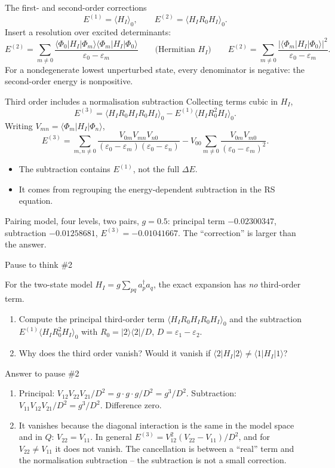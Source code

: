 \documentclass[aspectratio=169,10pt]{beamer}
\newcounter{thinkctr}
\newcommand{\thinkq}[2]{%
  \stepcounter{thinkctr}%
  \vfill
  \begin{tcolorbox}[enhanced,colback=palewarm,colframe=warm,boxrule=1.2pt,arc=4pt,
    grow to left by=6mm,grow to right by=6mm,
    left=16pt,right=16pt,top=16pt,bottom=18pt,
    fonttitle=\bfseries\Large,fontupper=\Large,
    title={Pause to think \#\thethinkctr\hfill\mdseries\normalsize(about #1 min -- discuss with your neighbour)}]
  #2
  \end{tcolorbox}
  \vfill}
\newcommand{\thinka}[1]{%
  \vfill
  \begin{tcolorbox}[enhanced,colback=paleteal,colframe=teal,boxrule=1.2pt,arc=4pt,
    grow to left by=6mm,grow to right by=6mm,
    left=16pt,right=16pt,top=16pt,bottom=18pt,
    fonttitle=\bfseries\Large,fontupper=\large,
    title={Answer to pause \#\thethinkctr}]
  #1
  \end{tcolorbox}
  \vfill}
\newcommand{\numbox}[1]{%
  \begin{tcolorbox}[colback=palegreen,colframe=teal!70!black,title={\bfseries Measured}]
  #1
  \end{tcolorbox}}
\newcommand{\ket}[1]{\vert #1\rangle}
\newcommand{\bra}[1]{\langle #1\vert}
\newcommand{\mel}[3]{\langle #1\lvert #2\rvert #3\rangle}
\newcommand{\av}[1]{\langle #1\rangle_0}
\newcommand{\cre}[1]{a_{#1}^{\dagger}}
\newcommand{\ann}[1]{a_{#1}}
\newcommand{\ph}{\Phi_0}
\begin{document}
\begin{frame}{The first- and second-order corrections}
\[
\boxed{E^{(1)}=\av{H_I},\qquad E^{(2)}=\av{H_I R_0H_I}.}
\]
Insert a resolution over excited determinants:
\[
\boxed{E^{(2)}=\sum_{m\ne0}
\frac{\mel{\ph}{H_I}{\Phi_m}\mel{\Phi_m}{H_I}{\ph}}
 {\varepsilon_0-\varepsilon_m}}
\qquad\text{(Hermitian } H_I\text{)}\qquad
E^{(2)}=\sum_{m\ne0}\frac{|\mel{\Phi_m}{H_I}{\ph}|^2}
 {\varepsilon_0-\varepsilon_m}.
\]
\small For a nondegenerate lowest unperturbed state, every denominator is negative: the second-order energy is nonpositive.
\end{frame}

\begin{frame}{Third order includes a normalisation subtraction}
Collecting terms cubic in \(H_I\),
\[
\boxed{E^{(3)}=
\av{H_I R_0H_I R_0H_I}
-E^{(1)}\av{H_I R_0^2H_I}.}
\]
Writing \(V_{mn}=\mel{\Phi_m}{H_I}{\Phi_n}\),
\[
E^{(3)}=\sum_{m,n\ne0}
\frac{V_{0m}V_{mn}V_{n0}}
 {(\varepsilon_0-\varepsilon_m)(\varepsilon_0-\varepsilon_n)}
-V_{00}\sum_{m\ne0}
\frac{V_{0m}V_{m0}}{(\varepsilon_0-\varepsilon_m)^2}.
\]
\begin{itemize}
\item The subtraction contains \(E^{(1)}\), not the full \(\Delta E\).
\item It comes from regrouping the energy-dependent subtraction in the RS equation.
\end{itemize}
\numbox{Pairing model, four levels, two pairs, \(g=0.5\): principal term \(-0.02300347\), subtraction \(-0.01258681\), \(E^{(3)}=-0.01041667\). The ``correction'' is larger than the answer.}
\end{frame}

\begin{frame}{Pause to think \#2}
\thinkq{4}{For the two-state model \(H_I=g\sum_{pq}\cre{p}\ann{q}\), the exact expansion has \emph{no} third-order term.
\begin{enumerate}
\item Compute the principal third-order term \(\av{H_IR_0H_IR_0H_I}\) and the subtraction \(E^{(1)}\av{H_IR_0^2H_I}\) with \(R_0=\ket{2}\bra{2}/D\), \(D=\varepsilon_1-\varepsilon_2\).
\item Why does the third order vanish? Would it vanish if \(\mel{2}{H_I}{2}\ne\mel{1}{H_I}{1}\)?
\end{enumerate}}
\end{frame}

\begin{frame}{Answer to pause \#2}
\thinka{%
\begin{enumerate}
\item Principal: \(V_{12}V_{22}V_{21}/D^2=g\cdot g\cdot g/D^2=g^3/D^2\). Subtraction: \(V_{11}V_{12}V_{21}/D^2=g^3/D^2\). Difference zero.
\item It vanishes because the diagonal interaction is the same in the model space and in \(Q\): \(V_{22}=V_{11}\). In general \(E^{(3)}=V_{12}^2(V_{22}-V_{11})/D^2\), and for \(V_{22}\ne V_{11}\) it does not vanish. The cancellation is between a ``real'' term and the normalisation subtraction -- the subtraction is not a small correction.
\end{enumerate}}
\end{frame}
\end{document}
